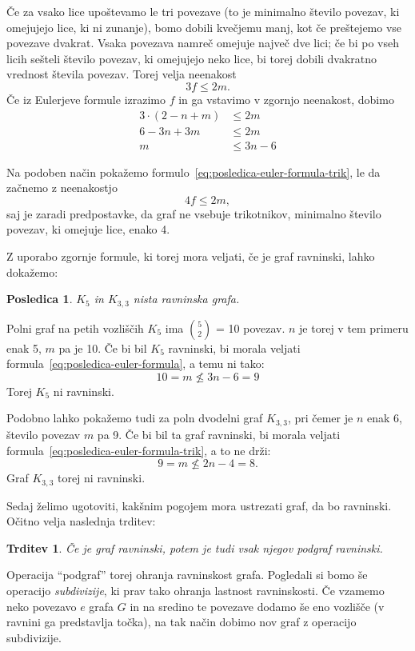 \documentclass[12pt,a4paper]{amsart}
\theoremstyle{definition} %
\theoremstyle{plain} %
\newtheorem{trditev}[definicija]{Trditev}
\newtheorem{posledica}[definicija]{Posledica}
\begin{document}
\proof
    Če za vsako lice upoštevamo le tri povezave (to je minimalno število povezav, ki omejujejo lice, ki ni zunanje), bomo dobili kvečjemu manj, kot če preštejemo vse povezave dvakrat.
    Vsaka povezava namreč omejuje največ dve lici; če bi po vseh licih sešteli število povezav, ki omejujejo neko lice, bi torej dobili dvakratno vrednost števila povezav.
    Torej velja neenakost
    \[ 3f \leq 2m .\]
    Če iz Eulerjeve formule izrazimo $f$ in ga vstavimo v zgornjo neenakost, dobimo
    \begin{align*}
        3\cdot(2-n+m) &\leq 2m \\
        6 - 3n + 3m &\leq 2m \\
        m &\leq 3n - 6
    \end{align*}
    
    Na podoben način pokažemo formulo~\eqref{eq:posledica-euler-formula-trik}, le da začnemo z neenakostjo 
    \[ 4f \leq 2m, \]
    saj je zaradi predpostavke, da graf ne vsebuje trikotnikov, minimalno število povezav, ki omejuje lice, enako 4. 
\endproof

Z uporabo zgornje formule, ki torej mora veljati, če je graf ravninski, lahko dokažemo:
\begin{posledica}
    \label{posl:neravninska-grafa}
    $K_5$ in $K_{3,3}$ nista ravninska grafa.
\end{posledica}

\proof
    Polni graf na petih vozliščih $K_5$ ima {$5 \choose 2$} = 10 povezav. $n$ je torej v tem primeru enak
    5, $m$ pa je 10. Če bi bil $K_5$ ravninski, bi morala veljati formula~\eqref{eq:posledica-euler-formula},
    a temu ni tako:
    \[ 10 = m \nleq 3n - 6 = 9 \]
    Torej $K_5$ ni ravninski.
    
    Podobno lahko pokažemo tudi za poln dvodelni graf $K_{3,3}$, pri čemer je $n$ enak 6, število povezav $m$ pa 9. Če bi bil ta graf ravninski, bi morala veljati formula~\eqref{eq:posledica-euler-formula-trik}, a to ne drži:
    \[ 9 = m \nleq 2n - 4 = 8. \] 
    Graf $K_{3,3}$ torej ni ravninski. \qedhere
\endproof

Sedaj želimo ugotoviti, kakšnim pogojem mora ustrezati graf, da bo ravninski. Očitno velja naslednja trditev:

\begin{trditev}
    \label{trd:podgraf}
    Če je graf ravninski, potem je tudi vsak njegov podgraf ravninski. %
\end{trditev}

Operacija ``podgraf'' torej ohranja ravninskost grafa.
Pogledali si bomo še operacijo \emph{subdivizije}, ki prav tako ohranja lastnost ravninskosti. Če vzamemo neko povezavo $e$ grafa $G$ in na sredino te povezave dodamo še eno vozlišče (v ravnini ga predstavlja točka), na tak način dobimo nov graf z operacijo subdivizije. \cite[str.~66]{bib:potocnik}
\end{document}
